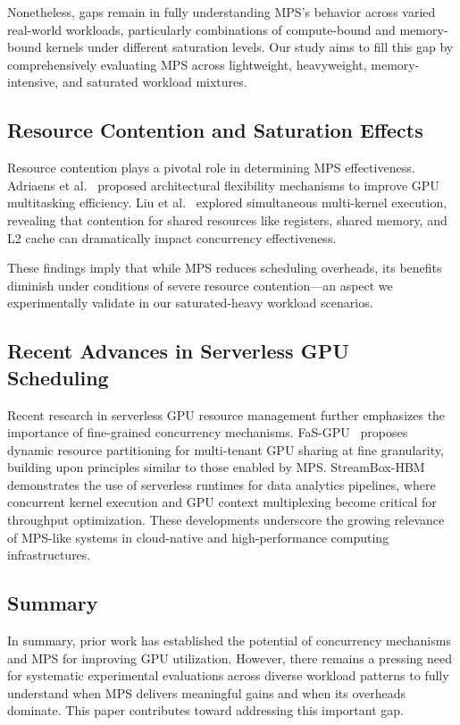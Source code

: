 \documentclass[sigconf,nonacm]{acmart}
\begin{document}
Nonetheless, gaps remain in fully understanding MPS's behavior across varied real-world workloads, particularly combinations of compute-bound and memory-bound kernels under different saturation levels. Our study aims to fill this gap by comprehensively evaluating MPS across lightweight, heavyweight, memory-intensive, and saturated workload mixtures.

\subsection{Resource Contention and Saturation Effects}

Resource contention plays a pivotal role in determining MPS effectiveness. Adriaens et al.~\cite{adriaens2012flexibility} proposed architectural flexibility mechanisms to improve GPU multitasking efficiency. Liu et al.~\cite{liu2018simultaneous} explored simultaneous multi-kernel execution, revealing that contention for shared resources like registers, shared memory, and L2 cache can dramatically impact concurrency effectiveness.

These findings imply that while MPS reduces scheduling overheads, its benefits diminish under conditions of severe resource contention—an aspect we experimentally validate in our saturated-heavy workload scenarios.


\subsection{Recent Advances in Serverless GPU Scheduling}
Recent research in serverless GPU resource management further emphasizes the importance of fine-grained concurrency mechanisms. FaS-GPU~\cite{fang2020fasgpu} proposes dynamic resource partitioning for multi-tenant GPU sharing at fine granularity, building upon principles similar to those enabled by MPS. StreamBox-HBM~\cite{wang2023streamboxhbm} demonstrates the use of serverless runtimes for data analytics pipelines, where concurrent kernel execution and GPU context multiplexing become critical for throughput optimization. These developments underscore the growing relevance of MPS-like systems in cloud-native and high-performance computing infrastructures.

\subsection{Summary}

In summary, prior work has established the potential of concurrency mechanisms and MPS for improving GPU utilization. However, there remains a pressing need for systematic experimental evaluations across diverse workload patterns to fully understand when MPS delivers meaningful gains and when its overheads dominate. This paper contributes toward addressing this important gap.
\end{document}
